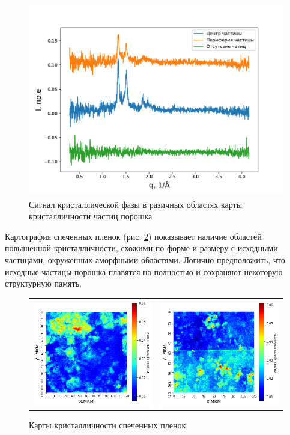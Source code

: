 \begin{figure}[h!]
 
    \includegraphics[width = \linewidth]{fig/var-profile.pdf}
    \caption{Сигнал кристаллической фазы в разичных областях карты кристалличности частиц порошка}
    \label{fig:var-profile}
\end{figure}

Картография спеченных пленок (рис. \ref{fig:maps-filmr}) показывает наличие областей повышенной кристалличности, схожими по форме и размеру с исходными частицами, окруженных аморфными областями. Логично предположить, что исходные частицы порошка плавятся на полностью и сохраняют некоторую структурную память. 

	
		\begin{figure}[h]
\begin{tabular}{cc}
\includegraphics[width=0.5\linewidth]{fig/72map.png}
&
\includegraphics[width=0.5\linewidth]{fig/map71.png} \\
\end{tabular}
\caption{Карты кристалличности спеченных пленок}
\label{fig:maps-filmr}
\end{figure}
	
	

